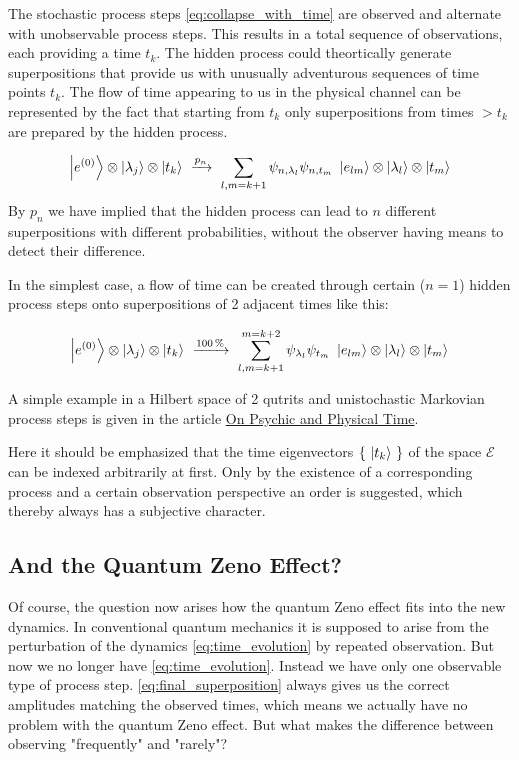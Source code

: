 \documentclass[12pt]{article}
\begin{document}
The stochastic process steps \eqref{eq:collapse_with_time} are observed and alternate with unobservable process steps. This results in a total sequence of observations, each providing a time $t_k$. The hidden process could theortically generate superpositions that provide us with unusually adventurous sequences of time points $t_k$. The flow of time appearing to us in the physical channel can be represented by the fact that starting from $t_k$ only superpositions from times $> t_k$ are prepared by the hidden process.

\begin{equation} 
\label{eq:preparation_with_time}
\ket{e^{(0)}} \otimes \ket{\lambda_j} \otimes \ket{t_k}
\ \xrightarrow{p_{n}}\ 
\sum_{l,m=k+1} \psi_{n,\lambda_l}\psi_{n,t_m} \ \ket{e_{lm}} \otimes \ket{\lambda_l} \otimes \ket{t_m} 
\end{equation}
By $p_n$ we have implied that the hidden process can lead to $n$ different superpositions with different probabilities, without the observer having means to detect their difference.

In the simplest case, a flow of time can be created through certain ($n=1$) hidden process steps onto superpositions of 2 adjacent times like this:

\begin{equation*} 
\ket{e^{(0)}} \otimes \ket{\lambda_j} \otimes \ket{t_k}
\ \xrightarrow{100\,\%}\ 
\sum_{l,m=k+1}^{m=k+2} \psi_{\lambda_l}\psi_{t_m} \ \ket{e_{lm}} \otimes \ket{\lambda_l} \otimes \ket{t_m} 
\end{equation*}

A simple example in a Hilbert space of 2 qutrits and unistochastic Markovian process steps is given in the article \href{http://vermaschung.de/index.php?title=Warum_Panpsychismus%3F}{On Psychic and Physical Time}. 

Here it should be emphasized that the time eigenvectors $\{\ \ket{t_k}\ \}$ of the space $\mathscr{E}$ can be indexed arbitrarily at first. Only by the existence of a corresponding process and a certain observation perspective an order is suggested, which thereby always has a subjective character.

\subsection{And the Quantum Zeno Effect?}

Of course, the question now arises how the quantum Zeno effect fits into the new dynamics. In conventional quantum mechanics it is supposed to arise from the perturbation of the dynamics \eqref{eq:time_evolution} by repeated observation. But now we no longer have \eqref{eq:time_evolution}. Instead we have only one observable type of process step. \eqref{eq:final_superposition} always gives us the correct amplitudes matching the observed times, which means we actually have no problem with the quantum Zeno effect. But what makes the difference between observing "frequently" and "rarely"?
\end{document}
